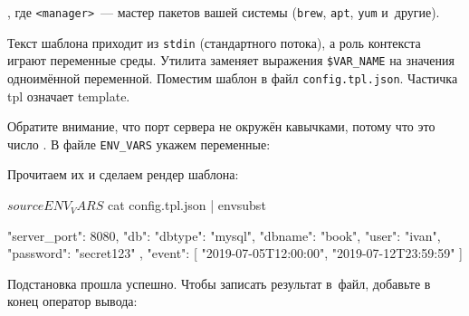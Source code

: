 \noindent
, где \verb|<manager>|~--- мастер пакетов вашей системы (\verb|brew|,
\verb|apt|, \verb|yum| и~другие).


Текст шаблона приходит из \verb|stdin| (стандартного потока), а роль контекста
играют переменные среды. Утилита заменяет выражения \verb|$VAR_NAME| на значения
одноимённой переменной. Поместим шаблон в файл \verb|config.tpl.json|. Частичка
tpl означает template.

\begin{english}
\end{english}

Обратите внимание, что порт сервера не окружён кавычками, потому что это число
. В файле \verb|ENV_VARS| укажем переменные:

\begin{english}
\end{english}

\noindent
Прочитаем их и сделаем рендер шаблона:

\begin{english}
  \begin{bash}
$ source ENV_VARS
$ cat config.tpl.json | envsubst
  \end{bash}
\end{english}

\begin{english}
  \begin{json}
{
    "server_port": 8080,
    "db": {
        "dbtype":   "mysql",
        "dbname":   "book",
        "user":     "ivan",
        "password": "secret123"
    },
    "event": [
        "2019-07-05T12:00:00",
        "2019-07-12T23:59:59"
    ]
}
  \end{json}
\end{english}

\noindent
Подстановка прошла успешно. Чтобы записать результат в~файл, добавьте в конец
оператор вывода:

